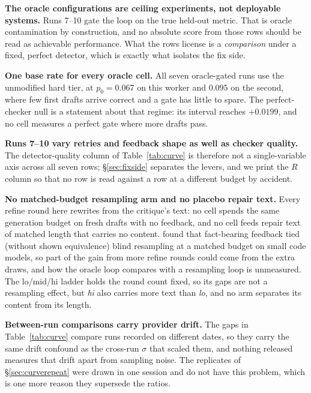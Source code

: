 \documentclass[11pt]{article}
\begin{document}
\textbf{The oracle configurations are ceiling experiments, not deployable systems.} Runs 7--10
gate the loop on the true held-out metric. That is oracle contamination by construction, and no
absolute score from those rows should be read as achievable performance. What the rows license is
a \emph{comparison} under a fixed, perfect detector, which is exactly what isolates the fix side.

\textbf{One base rate for every oracle cell.} All seven oracle-gated runs use the unmodified hard
tier, at $p_0 = 0.067$ on this worker and $0.095$ on the second, where few first drafts arrive
correct and a gate has little to spare. The perfect-checker null is a statement about that regime:
its interval reaches $+0.0199$, and no cell measures a perfect gate where more drafts pass.

\textbf{Runs 7--10 vary retries and feedback shape as well as checker quality.} The
detector-quality column of Table~\ref{tab:curve} is therefore not a single-variable axis across
all seven rows; \S\ref{sec:fixside} separates the levers, and we print the $R$ column so that no row is read against a row at a different budget by accident.

\textbf{No matched-budget resampling arm and no placebo repair text.} Every refine round here
rewrites from the critique's text: no cell spends the same generation budget on fresh drafts with
no feedback, and no cell feeds repair text of matched length that carries no content.
\citet{iscan2026falsification} found that fact-bearing feedback tied (without shown equivalence) blind resampling at a matched
budget on small code models, so part of the gain from more refine rounds could come from the extra
draws, and how the oracle loop compares with a resampling loop is unmeasured. The lo/mid/hi ladder
holds the round count fixed, so its gaps are not a resampling effect, but \emph{hi} also carries
more text than \emph{lo}, and no arm separates its content from its length.

\textbf{Between-run comparisons carry provider drift.} The gaps in Table~\ref{tab:curve} compare
runs recorded on different dates, so they carry the same drift confound as the cross-run $\sigma$
that scaled them, and nothing released measures that drift apart from sampling noise. The
replicates of
\S\ref{sec:curverepeat} were drawn in one session and do not have this problem, which is one more
reason they supersede the ratios.
\end{document}
